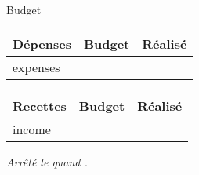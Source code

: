 \documentclass[10 pt]{report}
\begin{document}
\centerline{\Huge Budget}

\begin{minipage}[t]{.47\textwidth}
  \vspace{0pt}
  \begin{tabu} to \linewidth {|X|r|r|}
    \hline
    Dépenses & Budget & Réalisé \\
    \hline
    \hline
    {{expenses}}
    \hline
  \end{tabu}
  \vfill
\end{minipage}
\begin{minipage}[t]{.47\textwidth}
  \vspace{0pt}
  \begin{tabu} to \linewidth {|X|r|r|}
    \hline
    Recettes & Budget & Réalisé \\
    \hline
    \hline
    {{income}}
    \hline
  \end{tabu}
  \vfill
\end{minipage}

\textit{\small Arrêté le {{ quand }}.}
\end{document}

